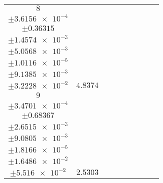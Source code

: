 \documentclass[8pt]{article}
\begin{document}
\begin{longtable}[l]{c c c c c c c c c}
$\num{8}$ & \begin{tabular}[c]{@{}c@{}}$\num{5.6547e-2}$ \\ $\pm\num{3.6156e-4}$\end{tabular} & \begin{tabular}[c]{@{}c@{}}$\num{0.19811}$ \\ $\pm\num{0.36315}$\end{tabular} & \begin{tabular}[c]{@{}c@{}}$\num{10.385}$ \\ $\pm\num{1.4574e-3}$\end{tabular} & \begin{tabular}[c]{@{}c@{}}$\num{2.0849e+3}$ \\ $\pm\num{5.0568e-3}$\end{tabular} & \begin{tabular}[c]{@{}c@{}}$\num{4.1709}$ \\ $\pm\num{1.0116e-5}$\end{tabular} & \begin{tabular}[c]{@{}c@{}}$\num{1.1857}$ \\ $\pm\num{9.1385e-3}$\end{tabular} & \begin{tabular}[c]{@{}c@{}}$\num{4.3352}$ \\ $\pm\num{3.2228e-2}$\end{tabular} & $\num{4.8374}$\\
$\num{9}$ & \begin{tabular}[c]{@{}c@{}}$\num{2.9773e-2}$ \\ $\pm\num{3.4701e-4}$\end{tabular} & \begin{tabular}[c]{@{}c@{}}$\num{-0.41322}$ \\ $\pm\num{0.68367}$\end{tabular} & \begin{tabular}[c]{@{}c@{}}$\num{-7.5551}$ \\ $\pm\num{2.6515e-3}$\end{tabular} & \begin{tabular}[c]{@{}c@{}}$\num{2.1359e+3}$ \\ $\pm\num{9.0805e-3}$\end{tabular} & \begin{tabular}[c]{@{}c@{}}$\num{4.2729}$ \\ $\pm\num{1.8166e-5}$\end{tabular} & \begin{tabular}[c]{@{}c@{}}$\num{1.1615}$ \\ $\pm\num{1.6486e-2}$\end{tabular} & \begin{tabular}[c]{@{}c@{}}$\num{4.1299}$ \\ $\pm\num{5.516e-2}$\end{tabular} & $\num{2.5303}$\\

\end{longtable}
\end{document}
